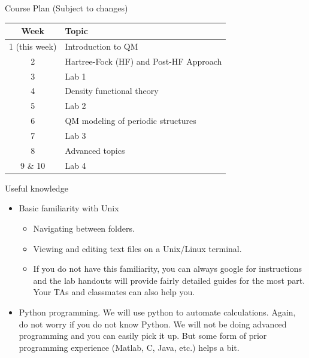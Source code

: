 \documentclass[aspectratio=169]{beamer}
\begin{document}
    \begin{frame}{Course Plan (Subject to changes)}
        \begin{table}[]
            \centering
            \begin{tabular}{c| l}
                \textbf{Week} & \textbf{Topic}                         \\
                \hline
                1 (this week) & Introduction to QM                     \\
                2             & Hartree-Fock (HF) and Post-HF Approach \\
                3             & Lab 1                                  \\
                4             & Density functional theory              \\
                5             & Lab 2                                  \\
                6             & QM modeling of periodic structures     \\
                7             & Lab 3                                  \\
                8             & Advanced topics                        \\
                9 \& 10       & Lab 4
            \end{tabular}
        \end{table}

    \end{frame}


    \begin{frame}{Useful knowledge}
        \begin{itemize}
            \item Basic familiarity with Unix
            \begin{itemize}
                \item Navigating between folders.
                \item Viewing and editing text files on a Unix/Linux terminal.
                \item If you do not have this familiarity, you can always google for instructions and the lab handouts will provide fairly detailed guides for the most part. Your TAs and classmates can also help you.
            \end{itemize}
            \item Python programming. We will use python to automate calculations. Again, do not worry if you do not know Python. We will not be doing advanced programming and you can easily pick it up. But some form of prior programming experience (Matlab, C, Java, etc.) helps a bit.
        \end{itemize}
    \end{frame}
\end{document}

